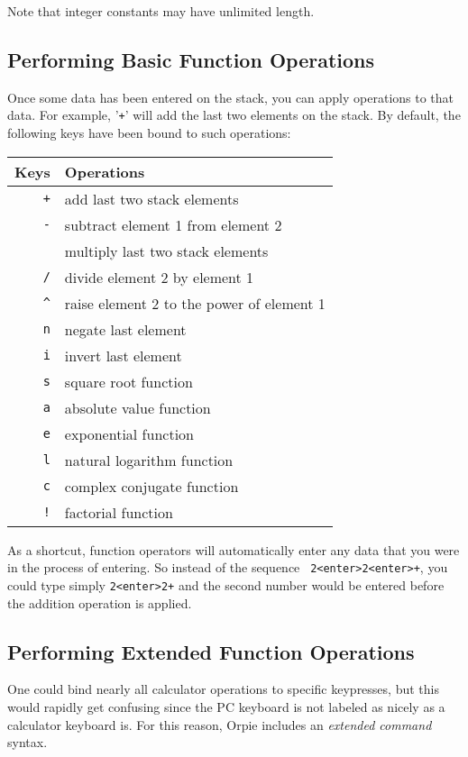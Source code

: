 \documentclass[11pt,notitlepage]{article}
\begin{document}
Note that integer constants may have unlimited length.

\subsection{Performing Basic Function Operations}
\label{functionops}
Once some data has been entered on the stack, you can apply operations to that
data.  For example, '{\tt +}' will add the last two elements on the stack.  By
default, the following keys have been bound to such operations:
\begin{center}
   \begin{tabular}[t]{|r|l|}
      \hline Keys & Operations \\
      \hline
      {\tt +} & add last two stack elements \\
      {\tt -} & subtract element 1 from element 2 \\
      {\tt *} & multiply last two stack elements \\
      {\tt /} & divide element 2 by element 1 \\
      {\tt \^{}} & raise element 2 to the power of element 1 \\
      {\tt n} & negate last element \\
      {\tt i} & invert last element \\
      {\tt s} & square root function \\
      {\tt a} & absolute value function \\
      {\tt e} & exponential function \\
      {\tt l} & natural logarithm function \\
      {\tt c} & complex conjugate function \\
      {\tt !} & factorial function  \\
      \hline
   \end{tabular}
\end{center}

As a shortcut, function operators will automatically enter any data that you
were in the process of entering.  So instead of the sequence {\tt
2<enter>2<enter>+}, you could type simply {\tt 2<enter>2+} and the second number
would be entered before the addition operation is applied.

\subsection{Performing Extended Function Operations}
\label{extendedfunctions}
One could bind nearly all calculator operations to specific keypresses, but this
would rapidly get confusing since the PC keyboard is not labeled as nicely as a
calculator keyboard is.  For this reason, Orpie includes an {\em extended
command} syntax.
\end{document}
